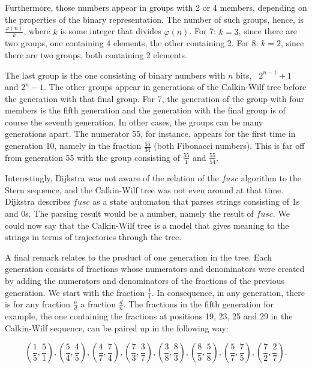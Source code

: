 \documentclass[tikz]{scrreprt}
\newcommand{\Varid}[1]{\mathit{#1}}
\begin{document}
Furthermore, those numbers appear in groups
with 2 or 4 members, depending on the properties 
of the binary representation. The number of such groups,
hence, is $\frac{\varphi(n)}{k}$, 
where $k$ is some integer that divides $\varphi(n)$.
For 7: $k=3$, since there are two groups,
one containing 4 elements, the other containing 2.
For 8: $k=2$, since there are two groups, 
both containing 2 elements.


The last group is the one consisting of
binary numbers with $n$ bits, \ie\ $2^{n-1}+1$ and $2^n-1$.
The other groups appear in generations of the Calkin-Wilf tree
before the generation with that final group.
For 7, the generation of the group
with four members is the fifth generation and
the generation with the final group is of course the seventh generation.
In other cases,
the groups can be many generations apart.
The numerator 55, for instance, appears for the first time
in generation 10, namely in the fraction $\frac{55}{34}$
(both Fibonacci numbers).
This is far off from generation 55 
with the group consisting of $\frac{55}{1}$ and $\frac{55}{54}$.

Interestingly, Dijkstra was not aware of the relation
of the \ensuremath{\Varid{fusc}} algorithm to the Stern sequence, and
the Calkin-Wilf tree was not even around at that time.
Dijkstra describes \ensuremath{\Varid{fusc}} as a state automaton that
parses strings consisting of 1s and 0s.
The parsing result would be a number, 
namely the result of \ensuremath{\Varid{fusc}}.
We could now say that the Calkin-Wilf tree
is a model that gives meaning to the strings
in terms of trajectories through the tree.

A final remark relates to the product of one generation in the tree.
Each generation consists of fractions 
whose numerators and denominators were created
by adding the numerators and denominators 
of the fractions of the previous generation.
We start with the fraction $\frac{1}{1}$.
In consequence, in any generation, 
there is for any fraction $\frac{n}{d}$ 
a fraction $\frac{d}{n}$.
The fractions in the fifth generation for example,
the one containing the fractions 
at positions 19, 23, 25 and 29 in the Calkin-Wilf sequence,
can be paired up in the following way:

\[
\left(\frac{1}{5}, \frac{5}{1}\right),
\left(\frac{5}{4}, \frac{4}{5}\right),
\left(\frac{4}{7}, \frac{7}{4}\right),
\left(\frac{7}{3}, \frac{3}{7}\right),
\left(\frac{3}{8}, \frac{8}{3}\right),
\left(\frac{8}{5}, \frac{5}{8}\right),
\left(\frac{5}{7}, \frac{7}{5}\right),
\left(\frac{7}{2}, \frac{2}{7}\right).
\]
\end{document}
